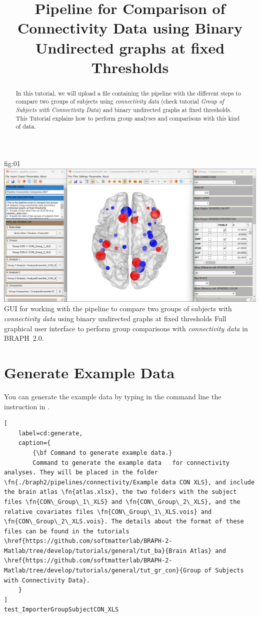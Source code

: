 \documentclass[justified]{tufte-handout}
\title{Pipeline for Comparison of Connectivity Data using Binary Undirected graphs at fixed Thresholds}
\begin{document}
\maketitle

\begin{abstract}
\noindent
In this tutorial, we will upload a file containing the pipeline with the different steps to compare two groups of subjects using \emph{connectivity data} (check tutorial \emph{Group of Subjects with Connectivity Data}) and binary undirected graphs at fixed thresholds. This Tutorial explains how to perform group analyses and comparisons with this kind of data.
\end{abstract}

\tableofcontents

	{fig:01}
	{\includegraphics{fig01.jpg}}
	{GUI for working with the pipeline to compare two groups of subjects with \emph{connectivity data} using binary undirected graphs at fixed thresholds}
	{
	Full graphical user interface to perform group comparisons with \emph{connectivity data} in BRAPH~2.0. 
	}

\clearpage
\section{Generate Example Data}

You can generate the example data by typing in the command line the instruction in .
%
\begin{lstlisting}[
	label=cd:generate,
	caption={
		{\bf Command to generate example data.}
		Command to generate the example data   for connectivity analyses. They will be placed in the folder \fn{./braph2/pipelines/connectivity/Example data CON XLS}, and include the brain atlas \fn{atlas.xlsx}, the two folders with the subject files \fn{CON\_Group\_1\_XLS} and \fn{CON\_Group\_2\_XLS}, and the relative covariates files \fn{CON\_Group\_1\_XLS.vois} and \fn{CON\_Group\_2\_XLS.vois}. The details about the format of these files can be found in the tutorials \href{https://github.com/softmatterlab/BRAPH-2-Matlab/tree/develop/tutorials/general/tut_ba}{Brain Atlas} and \href{https://github.com/softmatterlab/BRAPH-2-Matlab/tree/develop/tutorials/general/tut_gr_con}{Group of Subjects with Connectivity Data}.
	}
]
test_ImporterGroupSubjectCON_XLS
\end{lstlisting}
\end{document}

